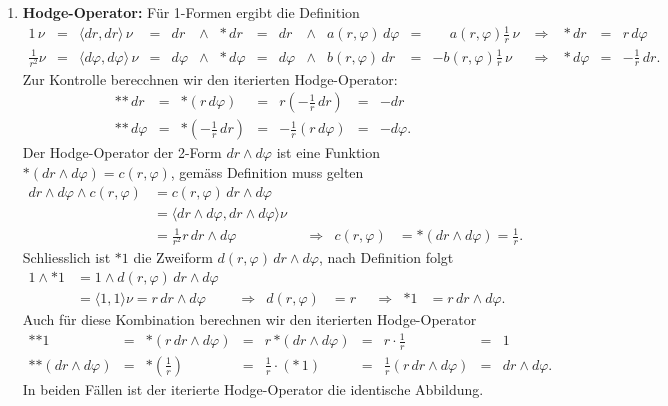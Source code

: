 \begin{enumerate}
\[\begin{matrix}
\langle d\varphi, dr \rangle & \langle d\varphi,d\varphi\rangle
\end{matrix}
\,\right|
=
\left|\,
\begin{matrix}
1&0\\
0&\frac{1}{r^2}
\end{matrix}
\,\right|
=
\frac{1}{r^2}
\]
gegeben.
\item{\bf Hodge-Operator:}
Für 1-Formen ergibt die Definition
\[
\renewcommand{\arraycolsep}{1.5pt}
\begin{array}{rcrcrclcrclclcrcl}
1\,\nu
&=&
\langle dr,dr\rangle\,\nu
&=&
dr &\wedge& {\ast\,dr}
&=&
dr &\wedge& a(r,\varphi)\,d\varphi
&=&
\phantom{-}a(r,\varphi)
\frac1r
\, \nu
&\;\Rightarrow\;&
\ast\,dr
&=&
r\,d\varphi
\\
\frac{1}{r^2}\nu
&=&
\langle d\varphi,d\varphi\rangle\,\nu
&=&
d\varphi &\wedge& {\ast\,d\varphi}
&=&
d\varphi &\wedge& b(r,\varphi)\,dr
&=&
-b(r,\varphi)\frac{1}{r}\,\nu
&\;\Rightarrow\;&
\ast\,d\varphi
&=&
-\frac1r\, dr.
\end{array}
\]
Zur Kontrolle berecchnen wir den iterierten Hodge-Operator:
\[
\renewcommand{\arraycolsep}{1.5pt}
\begin{array}{rclclcl}
\ast{\ast\,dr}
&=&
\ast(r\,d\varphi)
&=&
r(-\frac1r\,dr)
&=&
-dr
\\
\ast{\ast\,d\varphi}
&=&
\ast(-\frac1{r}\,dr)
&=&
-\frac1r(r\, d\varphi)
&=&
-d\varphi.
\end{array}
\]
Der Hodge-Operator der 2-Form $dr\wedge d\varphi$ ist eine Funktion
$\ast(dr\wedge d\varphi)=c(r,\varphi)$, gemäss Definition muss gelten
\begin{align*}
dr\wedge d\varphi\wedge c(r,\varphi)
&=
c(r,\varphi)\,dr\wedge d\varphi
\\
&=
\langle dr\wedge d\varphi,dr\wedge d\varphi\rangle \nu
\\
&=
\frac{1}{r^2} r\,dr\wedge d\varphi
&&\Rightarrow&
c(r,\varphi)
&=
\ast(dr\wedge d\varphi)
=
\frac1r.
\end{align*}
Schliesslich ist $\ast 1$ die Zweiform $d(r,\varphi)\,dr\wedge d\varphi$,
nach Definition folgt
\begin{align*}
1\wedge{\ast 1}
&=
1\wedge d(r,\varphi)\,dr\wedge d\varphi
\\
&=
\langle 1,1\rangle \nu
=
r\,dr\wedge d\varphi
&&\Rightarrow&
d(r,\varphi)
&=
r
&&\Rightarrow&
\ast 1
&=
r\,dr\wedge d\varphi.
\end{align*}
Auch für diese Kombination berechnen wir den iterierten Hodge-Operator
\[
\renewcommand{\arraycolsep}{1.5pt}
\begin{array}{rclclclcl}
\ast{\ast 1}
&=&
\ast (r\,dr\wedge d\varphi)
&=&
r\,{\ast(dr\wedge d\varphi)}
&=&
r\cdot\frac1r
&=&
1
\\
\ast{\ast(dr\wedge d\varphi)}
&=&
\ast(\frac1r)
&=&
\frac1r\cdot({\ast\, 1})
&=&
\frac1r(r\,dr\wedge d\varphi)
&=&
dr\wedge d\varphi.
\end{array}
\]
In beiden Fällen ist der iterierte Hodge-Operator die identische
Abbildung.
\end{enumerate}

